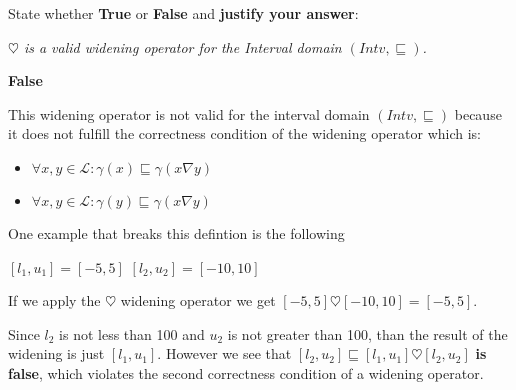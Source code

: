 \documentclass[12pt]{article}
\begin{document}
\begin{enumerate}
  State whether \textbf{True} or \textbf{False} and \textbf{justify your answer}: 
 
  \emph{$\heartsuit$ is a valid widening operator for the Interval domain $(Intv, \sqsubseteq)$.}
 
   \begin{mdframed}


     \textbf{False}

    This widening operator is not valid for the interval domain $(Intv, \sqsubseteq)$ because it does not fulfill the correctness condition of the widening operator which is:

    \begin{itemize}
          \item $\forall x, y \in \mathcal{L} : \gamma(x) \sqsubseteq \gamma(x \nabla y)$
          \item $\forall x, y \in \mathcal{L} : \gamma(y) \sqsubseteq \gamma(x \nabla y)$
    \end{itemize}

    One example that breaks this defintion is the following

    $[l_1,u_1] = [-5,5]$
    $[l_2, u_2] = [-10,10]$

    If we apply the $\heartsuit$ widening operator we get $[-5,5] \heartsuit [-10,10] = [-5,5]$.

    Since $l_2$ is not less than 100 and $u_2$ is not greater than 100, than the result of the widening is just $[l_1,u_1]$. However we see that $[l_2,u_2] \sqsubseteq [l_1, u_1] \heartsuit [l_2, u_2]$ \textbf{is false}, which violates the second correctness condition of a widening operator. 
     
   \end{mdframed}

\end{enumerate}
    
\end{document}
